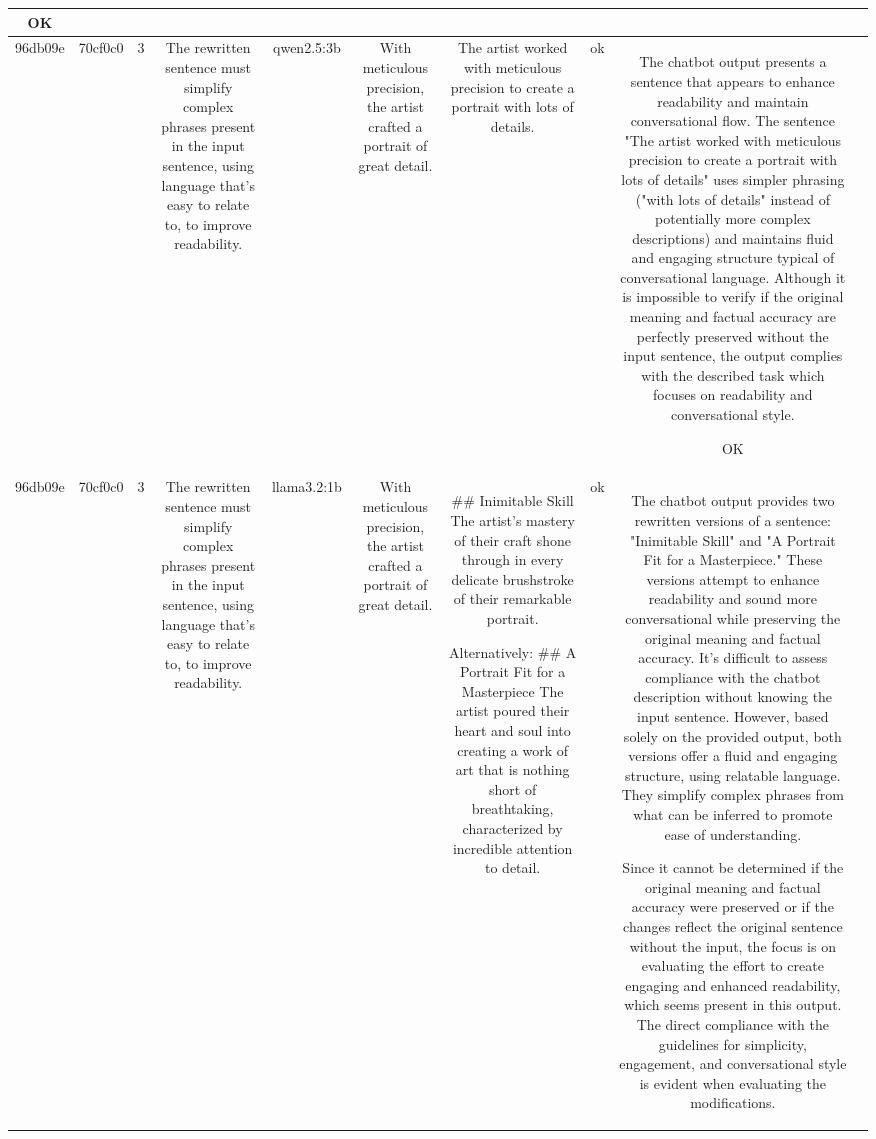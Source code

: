 \begin{table}[h!]
\begin{tabular}{|c|c|c|c|c|c|c|c|c|c|}
OK & \\
\hline
96db09e & 70cf0c0 & 3 & The rewritten sentence must simplify complex phrases present in the input sentence, using language that's easy to relate to, to improve readability. & qwen2.5:3b & With meticulous precision, the artist crafted a portrait of great detail. & The artist worked with meticulous precision to create a portrait with lots of details. & ok & The chatbot output presents a sentence that appears to enhance readability and maintain conversational flow. The sentence "The artist worked with meticulous precision to create a portrait with lots of details" uses simpler phrasing ("with lots of details" instead of potentially more complex descriptions) and maintains fluid and engaging structure typical of conversational language. Although it is impossible to verify if the original meaning and factual accuracy are perfectly preserved without the input sentence, the output complies with the described task which focuses on readability and conversational style.

OK & \\
\hline
96db09e & 70cf0c0 & 3 & The rewritten sentence must simplify complex phrases present in the input sentence, using language that's easy to relate to, to improve readability. & llama3.2:1b & With meticulous precision, the artist crafted a portrait of great detail. & ## Inimitable Skill
The artist's mastery of their craft shone through in every delicate brushstroke of their remarkable portrait.

Alternatively:
## A Portrait Fit for a Masterpiece
The artist poured their heart and soul into creating a work of art that is nothing short of breathtaking, characterized by incredible attention to detail. & ok & The chatbot output provides two rewritten versions of a sentence: "Inimitable Skill" and "A Portrait Fit for a Masterpiece." These versions attempt to enhance readability and sound more conversational while preserving the original meaning and factual accuracy. It's difficult to assess compliance with the chatbot description without knowing the input sentence. However, based solely on the provided output, both versions offer a fluid and engaging structure, using relatable language. They simplify complex phrases from what can be inferred to promote ease of understanding.

Since it cannot be determined if the original meaning and factual accuracy were preserved or if the changes reflect the original sentence without the input, the focus is on evaluating the effort to create engaging and enhanced readability, which seems present in this output. The direct compliance with the guidelines for simplicity, engagement, and conversational style is evident when evaluating the modifications.


\end{tabular}
\end{table}
